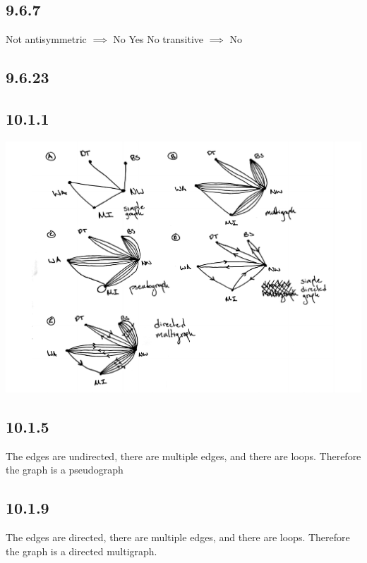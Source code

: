 \documentclass[12pt,titlepage]{extarticle}
\begin{document}
\subsection*{9.6.7}
\begin{tasks}
    \task Not antisymmetric $\implies$ No
    \task Yes
    \task No transitive $\implies$ No
\end{tasks}

\subsection*{9.6.23}
\begin{center}
    
\end{center}

\subsection*{10.1.1} %
\begin{center}
    \includegraphics[scale=0.6]{figures/planes.pdf}
\end{center}

\subsection*{10.1.5}
The edges are undirected, there are multiple edges, and there are loops. Therefore the graph is a pseudograph

\subsection*{10.1.9}
The edges are directed, there are multiple edges, and there are loops. Therefore the graph is a directed multigraph.
\end{document}
